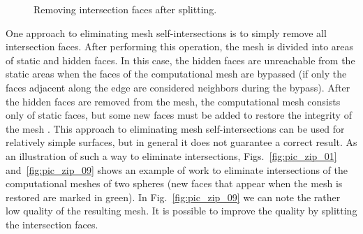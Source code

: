 \documentclass[
11pt,%
tightenlines,%
twoside,%
onecolumn,%
nofloats,%
nobibnotes,%
nofootinbib,%
superscriptaddress,%
noshowpacs,%
centertags]%
{revtex4-2}
\begin{document}
\begin{figure}[h]
\begin{minipage}[h]{0.3\textwidth}
    \caption{Removing intersection faces after splitting.}\label{fig:pic_zip_15}
  \end{minipage}
\end{figure}

One approach to eliminating mesh self-intersections is to simply remove all intersection faces.
After performing this operation, the mesh is divided into areas of static and hidden faces.
In this case, the hidden faces are unreachable from the static areas when the faces of the computational mesh are bypassed (if only the faces adjacent along the edge are considered neighbors during the bypass).
After the hidden faces are removed from the mesh, the computational mesh consists only of static faces, but some new faces must be added to restore the integrity of the mesh \cite{Charton}.
This approach to eliminating mesh self-intersections can be used for relatively simple surfaces, but in general it does not guarantee a correct result.
As an illustration of such a way to eliminate intersections,
Figs.~\ref{fig:pic_zip_01} and~\ref{fig:pic_zip_09} shows an example
of work to eliminate intersections of the computational meshes of
two spheres (new faces that appear when the mesh is restored are
marked in green).
In Fig.~\ref{fig:pic_zip_09} we can note the rather low quality of the resulting mesh.
It is possible to improve the quality by splitting the intersection faces.
\end{document}
